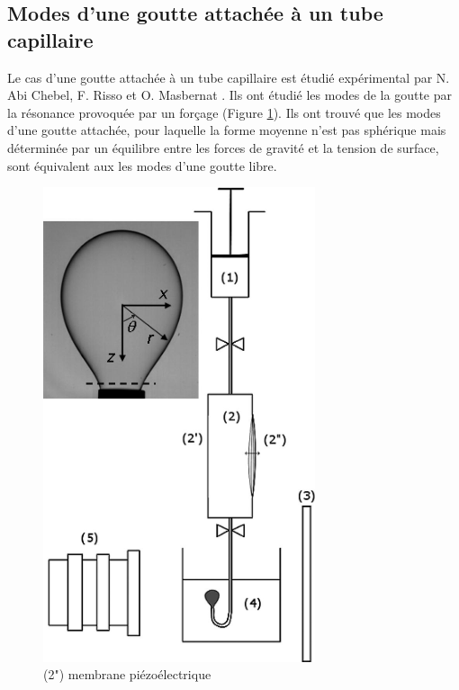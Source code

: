 \documentclass[a4paper]{report}
\begin{document}
\subsection{Modes d'une goutte attachée à un tube capillaire}
Le cas d'une goutte attachée à un tube capillaire est étudié expérimental par N. Abi Chebel, F. Risso et O. Masbernat \cite{3}.
Ils ont étudié les modes de la goutte par la résonance provoquée par un forçage (Figure \ref{experience}).
Ils ont trouvé que les modes d'une goutte attachée,
pour laquelle la forme moyenne n'est pas sphérique mais déterminée par un équilibre entre les forces de gravité et la tension de surface,
sont équivalent aux les modes d'une goutte libre.
\begin{figure}[h!] 
\begin{center}
\includegraphics[width=8cm]{experience.jpg}
\caption{(2") membrane piézoélectrique}
\label{experience}
\end{center}
\end{figure}
\newpage
\end{document}
